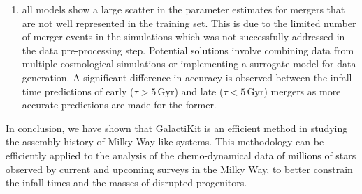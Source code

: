 \begin{enumerate}
    \item  all models show a large scatter in the parameter estimates for mergers that are not well represented in the training set. This is due to the limited number of merger events in the simulations which was not successfully addressed in the data pre-processing step. Potential solutions involve combining data from multiple cosmological simulations or implementing a surrogate model for data generation. A significant difference in accuracy is observed between the infall time predictions of early ($\tau>5\, \mathrm{Gyr}$) and late ($\tau<5\, \mathrm{Gyr}$) mergers as more accurate predictions are made for the former. 
\end{enumerate}


In conclusion, we have shown that GalactiKit is an efficient method in studying the assembly history of Milky Way-like systems. This methodology can be efficiently applied to the analysis of the chemo-dynamical data of millions of stars observed by current and upcoming surveys in the Milky Way, to better constrain the infall times and the masses of disrupted progenitors. 


